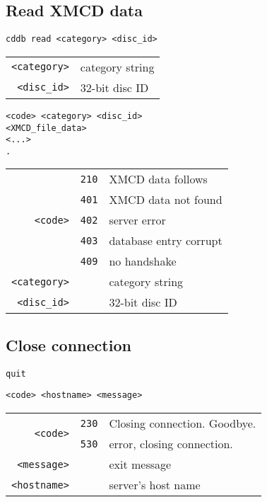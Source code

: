 \subsection{Read XMCD data}
\begin{Verbatim}[frame=single,label=\textit{To Server},showspaces=true]
cddb read <category> <disc_id>
\end{Verbatim}
\begin{tabular}{rl}
\texttt{<category>} & category string \\
\texttt{<disc\_id>} & 32-bit disc ID
\end{tabular}
\begin{Verbatim}[frame=single,label=\textit{From Server},showspaces=true]
<code> <category> <disc_id>
<XMCD_file_data>
<...>
.
\end{Verbatim}
\begin{tabular}{rcl}
\multirow{5}{3em}{\texttt{<code>}}
& \texttt{210} & XMCD data follows\\
& \texttt{401} & XMCD data not found\\
& \texttt{402} & server error\\
& \texttt{403} & database entry corrupt\\
& \texttt{409} & no handshake \\
\texttt{<category>} & & category string \\
\texttt{<disc\_id>} & & 32-bit disc ID \\
\end{tabular}

\subsection{Close connection}
\begin{Verbatim}[frame=single,label=\textit{To Server},showspaces=true]
quit
\end{Verbatim}
\begin{Verbatim}[frame=single,label=\textit{From Server},showspaces=true]
<code> <hostname> <message>
\end{Verbatim}
\begin{tabular}{rcl}
\multirow{2}{3em}{\texttt{<code>}}
& \texttt{230} & Closing connection.  Goodbye.\\
& \texttt{530} & error, closing connection.\\
\texttt{<message>} & & exit message \\
\texttt{<hostname>} & & server's host name
\end{tabular}

